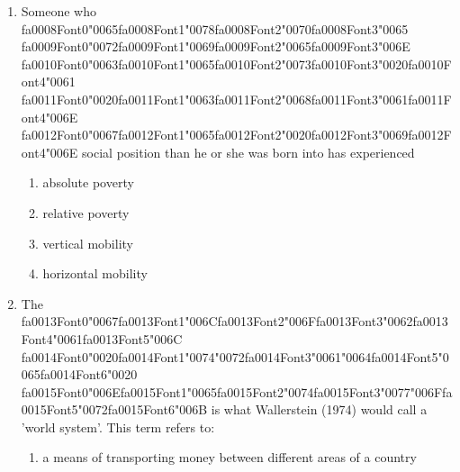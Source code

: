 \documentclass[12pt]{article}
\begin{document}
\begin{enumerate}[label=\arabic*.]
\begin{enumerate}[label=(\alph*)]
    \item elitists express concern with the Americanization of culture
\end{enumerate}
\item Someone who {\csname fa0008Font0\endcsname\char"0065}{\csname fa0008Font1\endcsname\char"0078}{\csname fa0008Font2\endcsname\char"0070}{\csname fa0008Font3\endcsname\char"0065} {\csname fa0009Font0\endcsname\char"0072}{\csname fa0009Font1\endcsname\char"0069}{\csname fa0009Font2\endcsname\char"0065}{\csname fa0009Font3\endcsname\char"006E} {\csname fa0010Font0\endcsname\char"0063}{\csname fa0010Font1\endcsname\char"0065}{\csname fa0010Font2\endcsname\char"0073}{\csname fa0010Font3\endcsname\char"0020}{\csname fa0010Font4\endcsname\char"0061} {\csname fa0011Font0\endcsname\char"0020}{\csname fa0011Font1\endcsname\char"0063}{\csname fa0011Font2\endcsname\char"0068}{\csname fa0011Font3\endcsname\char"0061}{\csname fa0011Font4\endcsname\char"006E} {\csname fa0012Font0\endcsname\char"0067}{\csname fa0012Font1\endcsname\char"0065}{\csname fa0012Font2\endcsname\char"0020}{\csname fa0012Font3\endcsname\char"0069}{\csname fa0012Font4\endcsname\char"006E} social position than he or she was born into has experienced
\begin{enumerate}[label=(\alph*)]
    \item absolute poverty
    \item relative poverty
    \item vertical mobility
    \item horizontal mobility
\end{enumerate}
\item The {\csname fa0013Font0\endcsname\char"0067}{\csname fa0013Font1\endcsname\char"006C}{\csname fa0013Font2\endcsname\char"006F}{\csname fa0013Font3\endcsname\char"0062}{\csname fa0013Font4\endcsname\char"0061}{\csname fa0013Font5\endcsname\char"006C} {\csname fa0014Font0\endcsname\char"0020}{\csname fa0014Font1\endcsname\char"0074}{\char"0072}{\csname fa0014Font3\endcsname\char"0061}{\char"0064}{\csname fa0014Font5\endcsname\char"0065}{\csname fa0014Font6\endcsname\char"0020} {\csname fa0015Font0\endcsname\char"006E}{\csname fa0015Font1\endcsname\char"0065}{\csname fa0015Font2\endcsname\char"0074}{\csname fa0015Font3\endcsname\char"0077}{\char"006F}{\csname fa0015Font5\endcsname\char"0072}{\csname fa0015Font6\endcsname\char"006B} is what Wallerstein (1974) would call a 'world system'. This term refers to:
\begin{enumerate}[label=(\alph*)]
    \item a means of transporting money between different areas of a country

\end{enumerate}
\end{enumerate}
\end{document}
